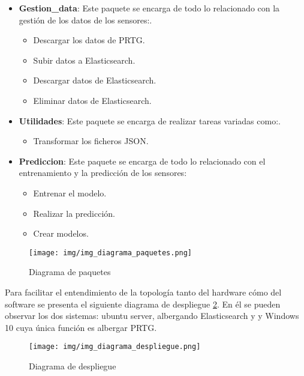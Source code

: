 \begin{itemize}
    \item \textbf{Gestion\_data}: Este paquete se encarga de todo lo relacionado con la gestión de los datos de los sensores:. 
    \begin{itemize}
        \item Descargar los datos de PRTG.
        \item Subir datos a Elasticsearch.
        \item Descargar datos de Elasticsearch.
        \item Eliminar datos de Elasticsearch.
    \end{itemize}
    
    \item \textbf{Utilidades}: Este paquete se encarga de realizar tareas variadas como:.
        \begin{itemize}
            \item Transformar los ficheros JSON.
        \end{itemize}
    \item \textbf{Prediccion}: Este paquete se encarga de todo lo relacionado con el entrenamiento y la predicción de los sensores:
        \begin{itemize}
            \item Entrenar el modelo.
            \item Realizar la predicción.
            \item Crear modelos.
        \end{itemize}
\end{itemize}

\clearpage

\begin{figure}[h]
	\centering
	\texttt{[image: img/img\_diagrama\_paquetes.png]}
	\caption{Diagrama de paquetes}
	\label{img_diagrama_paquetes}
\end{figure}

Para facilitar el entendimiento de la topología tanto del hardware cómo del software se presenta el siguiente diagrama de despliegue \ref{img_diagrama_despliegue}. En él se pueden observar los dos sistemas: ubuntu server, albergando Elasticsearch y \nombrePrograma y Windows 10 cuya única función es albergar PRTG.

\begin{figure}[h]
	\centering
	\texttt{[image: img/img\_diagrama\_despliegue.png]}
	\caption{Diagrama de despliegue}
	\label{img_diagrama_despliegue}
\end{figure}